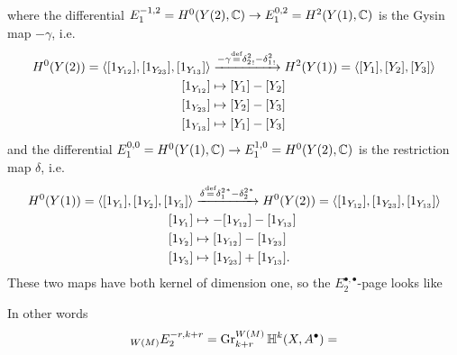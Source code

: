 \documentclass[../main.tex]{subfiles}
\begin{document}
\begin{es}
\begin{center}
\end{center}
where the differential $E_1^{-1,2}=H^0(Y(2),\mathbb{C}) \to E_1^{0,2}=H^2(Y(1),\mathbb{C})$ is the Gysin map $-\gamma$, i.e.
\begin{align*}
    H^0(Y(2))=\langle [1_{Y_{12}}], [1_{Y_{23}}],[1_{Y_{13}}]\rangle &\xrightarrow{-\gamma \stackrel{\text{def}}{=} {\delta_2^2}_!-{\delta_1^2}_!} H^2(Y(1))=\langle [Y_{1}], [Y_{2}],[Y_{3}]\rangle \\
     [1_{Y_{12}}] &\mapsto [Y_{1}] - [Y_{2}] \\
     [1_{Y_{23}}] &\mapsto [Y_{2}] - [Y_{3}] \\
     [1_{Y_{13}}] &\mapsto [Y_{1}] - [Y_{3}] \\
\end{align*}
and the differential $E_1^{0,0}=H^0(Y(1),\mathbb{C}) \to E_1^{1,0}=H^0(Y(2),\mathbb{C})$ is the restriction map $\delta$, i.e.
\begin{align*}
    H^0(Y(1))=\langle [1_{Y_{1}}], [1_{Y_{2}}],[1_{Y_{3}}] \rangle &\xrightarrow{\delta \stackrel{\text{def}}{=} {\delta_1^2}^*-{\delta_2^2}^*} H^0(Y(2))=\langle [1_{Y_{12}}], [1_{Y_{23}}],[1_{Y_{13}}] \rangle \\
     [1_{Y_{1}}] &\mapsto - [1_{Y_{12}}] - [1_{Y_{13}}] \\
     [1_{Y_{2}}] &\mapsto [1_{Y_{12}}] - [1_{Y_{23}}] \\
     [1_{Y_{3}}] &\mapsto [1_{Y_{23}}] + [1_{Y_{13}}].  \\
\end{align*}
These two maps have both kernel of dimension one,
so the $E_2^{\bullet,\bullet}$-page looks like 
\begin{center}
\end{center}
In other words 
\[
 {}_{W(M)}{}{E_2^{-r,k+r}}= \operatorname{Gr}^{W(M)}_{k+r} \mathbb{H}^k(X,A^\bullet)=
\]
\end{es}
\end{document}
